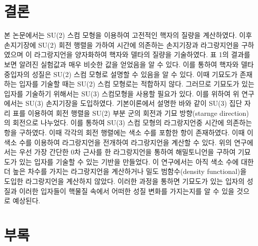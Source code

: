 \documentclass[superscriptaddress,
nofootinbib,byrevtex,fleqn,prd,12pt]{revtex4}
\begin{document}
\section{결론} \label{4}
본 논문에서는 SU(2) 스컴 모형을 이용하여 고전적인 핵자의 질량을 계산하였다. 이후 손지기장에 SU(2) 회전 행렬을 가하여 시간에 의존하는 손지기장과 라그랑지언을 구하였으며 이 라그랑지언을 양자화하여 핵자와 델타의 질량을 기술하였다.
표 1의 결과를 보면 알려진 실험값과 매우 비슷한 값을 얻었음을 알 수 있다. 이를 통하여 핵자와 델타 중입자의 성질은 SU(2) 스컴 모형로 설명할 수 있음을 알 수 있다. 이때 기묘도가 존재하는 입자를 기술할 때는 SU(2) 스컴 모형로는 적합하지 않다.
그러므로 기묘도가 있는 입자를 기술하기 위해서는 SU(3) 스컴모형을 사용할 필요가 있다. 이를 위하여 위 연구에서는 SU(3) 손지기장을 도입하였다. 기본이론에서 설명한 바와 같이 SU(3) 집단 자리 표를 이용하여 회전 행렬을 SU(2) 부분 군의 회전과 기묘 방향(starnge direction)의 회전으로 나누었다. 이를 통하여 SU(3) 스컴 모형의 라그랑지언중 시간에 의존하는 항을 구하였다. 이때 각각의 회전 행렬에는 색소 수를 포함한 항이 존재하였다. 이때 이 색소 수를 이용하여 라그랑지언을 전개하여 라그랑지언을 계산할 수 있다. 위의 연구에서는 우선 가장 간단한 0차 근사를 한 라그랑지언을 통하여 해밀토니언을 구하여 기묘도가 있는 입자를 기술할 수 있는 기반을 만들었다. 이 연구에서는 아직 색소 수에 대한 더 높은 차수를 가지는 라그랑지언을 계산하거나 밀도 범함수(density functional)을 도입한 라그랑지언을 계산하지 않았다. 이러한 과정을 통하면 기묘도가 있는 입자의 성질과 이러한 입자들이 핵물질 속에서 어떠한 성질 변화를 가지는지를 알 수 있을 것으로 예상된다.
\newpage

\section{부록} \label{5}
\end{document}
